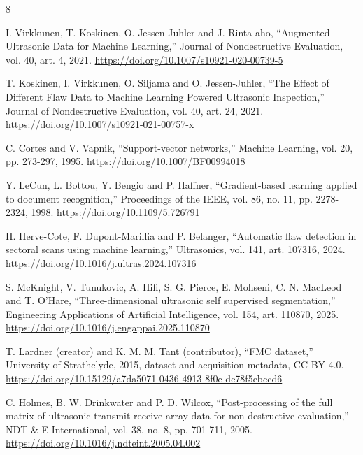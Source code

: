 \documentclass[11pt,a4paper]{article}
\begin{document}
\begin{thebibliography}{8}


 I. Virkkunen, T. Koskinen, O. Jessen-Juhler and J. Rinta-aho, ``Augmented Ultrasonic Data for Machine Learning,'' Journal of Nondestructive Evaluation, vol. 40, art. 4, 2021. \url{https://doi.org/10.1007/s10921-020-00739-5}

 T. Koskinen, I. Virkkunen, O. Siljama and O. Jessen-Juhler, ``The Effect of Different Flaw Data to Machine Learning Powered Ultrasonic Inspection,'' Journal of Nondestructive Evaluation, vol. 40, art. 24, 2021. \url{https://doi.org/10.1007/s10921-021-00757-x}

 C. Cortes and V. Vapnik, ``Support-vector networks,'' Machine Learning, vol. 20, pp. 273-297, 1995. \url{https://doi.org/10.1007/BF00994018}

 Y. LeCun, L. Bottou, Y. Bengio and P. Haffner, ``Gradient-based learning applied to document recognition,'' Proceedings of the IEEE, vol. 86, no. 11, pp. 2278-2324, 1998. \url{https://doi.org/10.1109/5.726791}

 H. Herve-Cote, F. Dupont-Marillia and P. Belanger, ``Automatic flaw detection in sectoral scans using machine learning,'' Ultrasonics, vol. 141, art. 107316, 2024. \url{https://doi.org/10.1016/j.ultras.2024.107316}

 S. McKnight, V. Tunukovic, A. Hifi, S. G. Pierce, E. Mohseni, C. N. MacLeod and T. O'Hare, ``Three-dimensional ultrasonic self supervised segmentation,'' Engineering Applications of Artificial Intelligence, vol. 154, art. 110870, 2025. \url{https://doi.org/10.1016/j.engappai.2025.110870}

 T. Lardner (creator) and K. M. M. Tant (contributor), ``FMC dataset,'' University of Strathclyde, 2015, dataset and acquisition metadata, CC BY 4.0. \url{https://doi.org/10.15129/a7da5071-0436-4913-8f0e-de78f5ebccd6}

 C. Holmes, B. W. Drinkwater and P. D. Wilcox, ``Post-processing of the full matrix of ultrasonic transmit-receive array data for non-destructive evaluation,'' NDT \& E International, vol. 38, no. 8, pp. 701-711, 2005. \url{https://doi.org/10.1016/j.ndteint.2005.04.002}

\end{thebibliography}\endgroup
\end{document}
